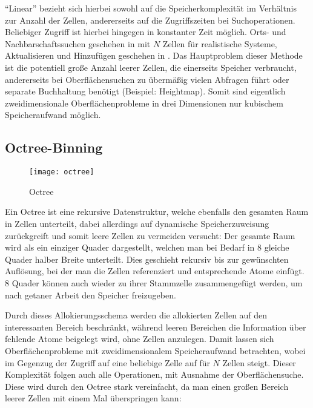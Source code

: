 ``Linear'' bezieht sich hierbei sowohl auf die Speicherkomplexität im Verhältnis zur Anzahl der Zellen, andererseits auf die Zugriffszeiten bei Suchoperationen. Beliebiger Zugriff ist hierbei hingegen in konstanter Zeit möglich.
Orts- und Nachbarschaftssuchen geschehen in  mit $N$ Zellen für realistische Systeme, Aktualisieren und Hinzufügen geschehen in .
Das Hauptproblem dieser Methode ist die potentiell große Anzahl leerer Zellen, die einerseits Speicher verbraucht, andererseits bei Oberflächensuchen zu übermäßig vielen Abfragen führt oder separate Buchhaltung benötigt (Beispiel: Heightmap).
Somit sind eigentlich zweidimensionale Oberflächenprobleme in drei Dimensionen nur kubischem Speicheraufwand möglich.

\subsection{Octree-Binning}

\begin{figure}[tbhp]
  \centering
  \texttt{[image: octree]}
  \caption[Octree]{Octree}
  \label{fig:octree}
\end{figure}

Ein Octree ist eine rekursive Datenstruktur, welche ebenfalls den gesamten Raum in Zellen unterteilt, dabei allerdings auf dynamische Speicherzuweisung zurückgreift und somit leere Zellen zu vermeiden versucht:
Der gesamte Raum wird als ein einziger Quader dargestellt, welchen man bei Bedarf in 8 gleiche Quader halber Breite unterteilt.
Dies geschieht rekursiv bis zur gewünschten Auflösung, bei der man die Zellen referenziert und entsprechende Atome einfügt.
8 Quader können auch wieder zu ihrer Stammzelle zusammengefügt werden, um nach getaner Arbeit den Speicher freizugeben.

Durch dieses Allokierungsschema werden die allokierten Zellen auf den interessanten Bereich beschränkt, während leeren Bereichen die Information über fehlende Atome beigelegt wird, ohne Zellen anzulegen.
Damit lassen sich Oberflächenprobleme mit zweidimensionalem Speicheraufwand betrachten, wobei im Gegenzug der Zugriff auf eine beliebige Zelle auf  für $N$ Zellen steigt.
Dieser Komplexität folgen auch alle Operationen, mit Ausnahme der Oberflächensuche.
Diese wird durch den Octree stark vereinfacht, da man einen großen Bereich leerer Zellen mit einem Mal überspringen kann:


